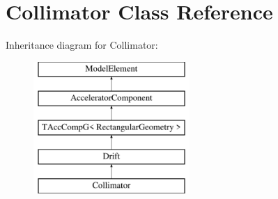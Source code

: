 \hypertarget{classCollimator}{}\section{Collimator Class Reference}
\label{classCollimator}
Inheritance diagram for Collimator\+:\begin{figure}[H]
\begin{center}
\leavevmode
\includegraphics[height=5.000000cm]{classCollimator}
\end{center}
\end{figure}
